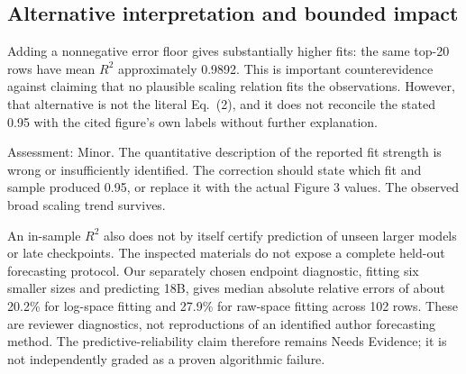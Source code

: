 \documentclass[10pt]{article}
\begin{document}
\subsection*{Alternative interpretation and bounded impact}
Adding a nonnegative error floor gives substantially higher fits: the same top-20 rows have mean \(R^2\) approximately 0.9892. This is important counterevidence against claiming that no plausible scaling relation fits the observations. However, that alternative is not the literal Eq. (2), and it does not reconcile the stated 0.95 with the cited figure’s own labels without further explanation.\par
Assessment: Minor. The quantitative description of the reported fit strength is wrong or insufficiently identified. The correction should state which fit and sample produced 0.95, or replace it with the actual Figure 3 values. The observed broad scaling trend survives.\par
An in-sample \(R^2\) also does not by itself certify prediction of unseen larger models or late checkpoints. The inspected materials do not expose a complete held-out forecasting protocol. Our separately chosen endpoint diagnostic, fitting six smaller sizes and predicting 18B, gives median absolute relative errors of about 20.2\% for log-space fitting and 27.9\% for raw-space fitting across 102 rows. These are reviewer diagnostics, not reproductions of an identified author forecasting method. The predictive-reliability claim therefore remains Needs Evidence; it is not independently graded as a proven algorithmic failure.\par
\end{document}
